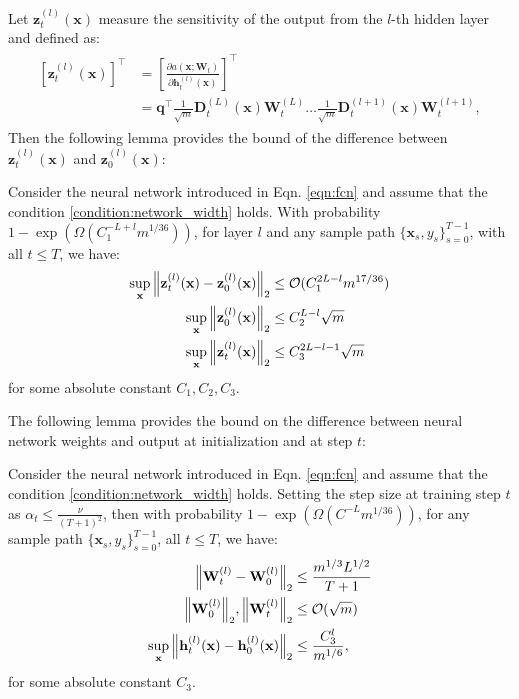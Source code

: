 Let $\mathbf{z}_t^{(l)} (\mathbf{x})$ measure the sensitivity of the output from the $l$-th hidden layer and defined as:
\begin{align*}
    \begin{split}
        [\mathbf{z}_t^{(l)}(\mathbf{x})]^\top &= \left [ \frac{\partial a(\mathbf{x}; \mathbf{W}_t)}{\partial \mathbf{h}_t^{(l)}(\mathbf{x})}\right]^\top \\
        &= \mathbf{q}^\top \frac{1}{\sqrt{m}} \mathbf{D}_t^{(L)}(\mathbf{x}) \mathbf{W}_t^{(L)} \dots \frac{1}{\sqrt{m}} \mathbf{D}_t^{(l+1)}(\mathbf{x}) \mathbf{W}_t^{(l+1)}, 
    \end{split} 
\end{align*}
Then the following lemma provides the bound of the difference between $\mathbf{z}_t^{(l)}(\mathbf{x})$ and $\mathbf{z}_0^{(l)}(\mathbf{x})$:
\begin{lemma}
\label{lemma:neural_cbo_nn_sensitivity_bound}
Consider the neural network introduced in Eqn. \ref{eqn:fcn} and assume that the condition \ref{condition:network_width} holds. With probability $1 - \exp (\Omega( C_1^{-L+l} m^{1/36}))$, for layer $l$ and any sample path $\{ \mathbf{x}_s, y_s\}_{s=0}^{T-1}$, with all $t\le T$, we have:
\begin{align*}
    \sup_\mathbf{x} \norm{\mathbf{z}_t^{(l)}(\mathbf{x}) - \mathbf{z}_0^{(l)}(\mathbf{x})}_2 & \le \mathcal{O}(C_1^{2L-l} m^{17/36}) 
    \\
    \sup_\mathbf{x} \norm{\mathbf{z}_0^{(l)}(\mathbf{x})}_2 &  \le C_2^{L-l} \sqrt{m}
    \\
    \sup_\mathbf{x} \norm{\mathbf{z}_t^{(l)}(\mathbf{x})}_2 &  \le C_3^{2L-l-1} \sqrt{m}
    \\
\end{align*}
for some absolute constant $C_1, C_2, C_3$.
\end{lemma}



The following lemma provides the bound on the difference between neural network weights and output at initialization and at step $t$:

\begin{lemma}
\label{lemma:neural_cbo_weights_and_output_bounds}
Consider the neural network introduced in Eqn. \ref{eqn:fcn} and assume that the condition \ref{condition:network_width} holds. Setting the step size at training step $t$ as $\alpha_t \le \frac{\nu}{(T+1)^2}$, then with probability $1 - \exp (\Omega( C^{-L} m^{1/36}))$, for any sample path $\{ \mathbf{x}_s, y_s\}_{s=0}^{T-1}$, all $t\le T$, we have:
\begin{align*}
    \norm{\mathbf{W}_t^{(l)} - \mathbf{W}_0^{(l)}}_2 & \le \frac{m^{1/3}L^{1/2}}{T+1} \\
    \norm{\mathbf{W}_0^{(l)}}_2, \norm{\mathbf{W}_t^{(l)}}_2 & \le \mathcal{O}(\sqrt{m})
    \\
    \sup_\mathbf{x} \norm{\mathbf{h}_t^{(l)}(\mathbf{x}) - \mathbf{h}_0^{(l)}(\mathbf{x})}_2 & \le \frac{C_3^l}{m^{1/6}}, 
\end{align*}
for some absolute constant $C_3$.
\end{lemma}


